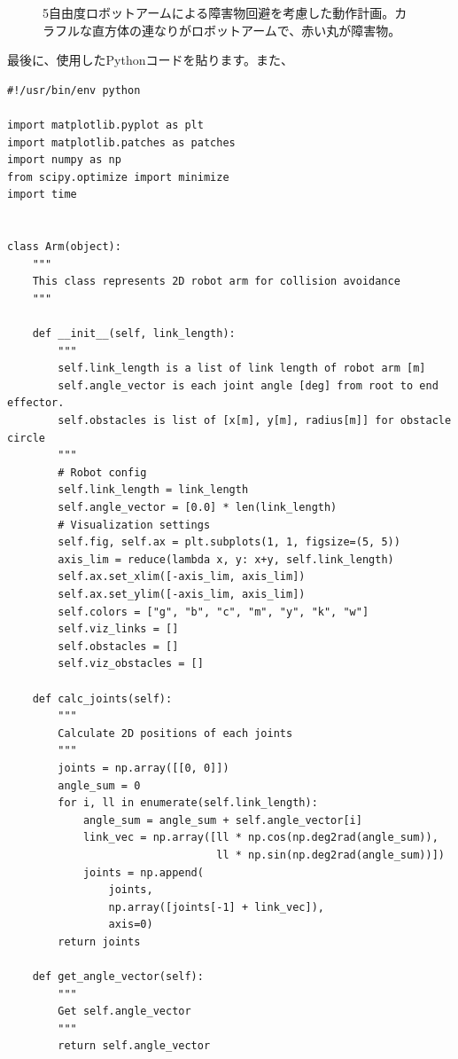 \begin{figure}[htbp]
\begin{minipage}[!h]{0.32\columnwidth}
\begin{center}
    \end{center}
  \end{minipage}
  \caption{5自由度ロボットアームによる障害物回避を考慮した動作計画。カラフルな直方体の連なりがロボットアームで、赤い丸が障害物。}
  \label{figure:5dof}
\end{figure}

最後に、使用したPythonコードを貼ります。また、

\fontsize{8pt}{8pt}\selectfont
\begin{verbatim}
#!/usr/bin/env python

import matplotlib.pyplot as plt
import matplotlib.patches as patches
import numpy as np
from scipy.optimize import minimize
import time


class Arm(object):
    """
    This class represents 2D robot arm for collision avoidance
    """

    def __init__(self, link_length):
        """
        self.link_length is a list of link length of robot arm [m]
        self.angle_vector is each joint angle [deg] from root to end effector.
        self.obstacles is list of [x[m], y[m], radius[m]] for obstacle circle
        """
        # Robot config
        self.link_length = link_length
        self.angle_vector = [0.0] * len(link_length)
        # Visualization settings
        self.fig, self.ax = plt.subplots(1, 1, figsize=(5, 5))
        axis_lim = reduce(lambda x, y: x+y, self.link_length)
        self.ax.set_xlim([-axis_lim, axis_lim])
        self.ax.set_ylim([-axis_lim, axis_lim])
        self.colors = ["g", "b", "c", "m", "y", "k", "w"]
        self.viz_links = []
        self.obstacles = []
        self.viz_obstacles = []

    def calc_joints(self):
        """
        Calculate 2D positions of each joints
        """
        joints = np.array([[0, 0]])
        angle_sum = 0
        for i, ll in enumerate(self.link_length):
            angle_sum = angle_sum + self.angle_vector[i]
            link_vec = np.array([ll * np.cos(np.deg2rad(angle_sum)),
                                 ll * np.sin(np.deg2rad(angle_sum))])
            joints = np.append(
                joints,
                np.array([joints[-1] + link_vec]),
                axis=0)
        return joints

    def get_angle_vector(self):
        """
        Get self.angle_vector
        """
        return self.angle_vector


\end{verbatim}
